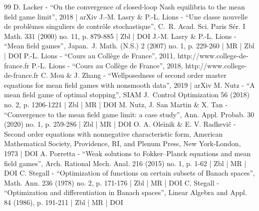 \begin{thebibliography}{99}
D. Lacker - “On the convergence of closed-loop Nash equilibria to the mean field game limit”, 2018 | arXiv
J.-M. Lasry \& P.-L. Lions - “Une classe nouvelle de problèmes singuliers de contrôle stochastique”, C. R. Acad. Sci. Paris Sér. I Math. 331 (2000) no. 11, p. 879-885 | Zbl | DOI
J.-M. Lasry \& P.-L. Lions - “Mean field games”, Japan. J. Math. (N.S.) 2 (2007) no. 1, p. 229-260 | MR | Zbl | DOI
P.-L. Lions - “Cours au Collège de France”, 2011, http://www.college-de-france.fr
P.-L. Lions - “Cours au Collège de France”, 2018, http://www.college-de-france.fr
C. Mou \& J. Zhang - “Wellposedness of second order master equations for mean field games with nonsmooth data”, 2019 | arXiv
M. Nutz - “A mean field game of optimal stopping”, SIAM J. Control Optimization 56 (2018) no. 2, p. 1206-1221 | Zbl | MR | DOI
M. Nutz, J. San Martin \& X. Tan - “Convergence to the mean field game limit: a case study”, Ann. Appl. Probab. 30 (2020) no. 1, p. 259-286 | Zbl | MR | DOI
O. A. Oleĭnik \& E. V. Radkevič - Second order equations with nonnegative characteristic form, American Mathematical Society, Providence, RI, and Plenum Press, New York-London, 1973 | DOI
A. Porretta - “Weak solutions to Fokker–Planck equations and mean field games”, Arch. Rational Mech. Anal. 216 (2015) no. 1, p. 1-62 | Zbl | MR | DOI
C. Stegall - “Optimization of functions on certain subsets of Banach spaces”, Math. Ann. 236 (1978) no. 2, p. 171-176 | Zbl | MR | DOI
C. Stegall - “Optimization and differentiation in Banach spaces”, Linear Algebra and Appl. 84 (1986), p. 191-211 | Zbl | MR | DOI
\end{thebibliography}
